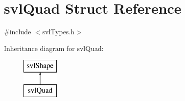 \hypertarget{structsvl_quad}{\section{svl\-Quad Struct Reference}
\label{structsvl_quad}
}


{\ttfamily \#include $<$svl\-Types.\-h$>$}

Inheritance diagram for svl\-Quad\-:\begin{figure}[H]
\begin{center}
\leavevmode
\includegraphics[height=2.000000cm]{d8/d79/structsvl_quad}
\end{center}
\end{figure}
